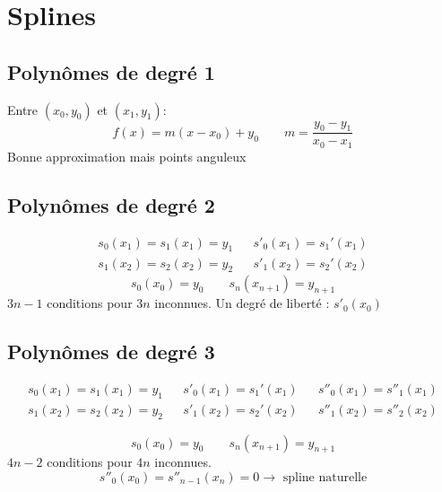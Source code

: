 \documentclass[resume]{subfiles}
\begin{document}
    \section{Splines}
    \subsection{Polynômes de degré 1}
        Entre $(x_0,y_0)$ et $(x_1,y_1)$:
        $$f(x)=m(x-x_0) + y_0\qquad m=\frac{y_0-y_1}{x_0-x_1}$$
        Bonne approximation mais points anguleux
    \subsection{Polynômes de degré 2}
    \begin{align*}
        s_0(x_1) =s_1(x_1)= y_1 & &s'_0(x_1)=s_1'(x_1)\\
        s_1(x_2) =s_2(x_2)= y_2 & &s'_1(x_2)=s_2'(x_2)
    \end{align*}
    $$s_0(x_0)=y_0\qquad s_n(x_{n+1})=y_{n+1}$$
    $3n-1$ conditions pour $3n$ inconnues. Un degré de liberté : $s'_0(x_0)$
    
    \subsection{Polynômes de degré 3}
    \begin{small}
	    \begin{align*}
        s_0(x_1) =s_1(x_1)= y_1 & &s'_0(x_1)=s_1'(x_1) & & s''_0(x_1)=s''_1(x_1)\\
        s_1(x_2) =s_2(x_2)= y_2 & &s'_1(x_2)=s_2'(x_2) & & s''_1(x_2)=s''_2(x_2)
    \end{align*}    
    \end{small}
    $$s_0(x_0)=y_0\qquad s_n(x_{n+1})=y_{n+1}$$
    $4n-2$ conditions pour $4n$ inconnues.
    $$s''_0(x_0)=s''_{n-1}(x_n)=0\longrightarrow \text{ spline naturelle}$$
\end{document}
